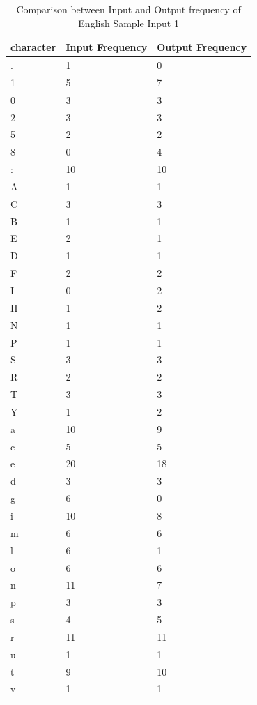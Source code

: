 \begin{table}[H]
\centering
\begin{tabular}{|p{2cm}|p{2cm}|p{2cm}|}
\hline
character & Input Frequency & Output Frequency \\
\hline
. & 1 & 0\\
\hline
1 & 5 & 7\\
\hline
0 & 3 & 3\\
\hline
2 & 3 & 3\\
\hline
5 & 2 & 2\\
\hline
8 & 0 & 4\\
\hline
: & 10 & 10\\
\hline
A & 1 & 1\\
\hline
C & 3 & 3\\
\hline
B & 1 & 1\\
\hline
E & 2 & 1\\
\hline
D & 1 & 1\\
\hline
F & 2 & 2\\
\hline
I & 0 & 2\\
\hline
H & 1 & 2\\
\hline
N & 1 & 1\\
\hline
P & 1 & 1\\
\hline
S & 3 & 3\\
\hline
R & 2 & 2\\
\hline
T & 3 & 3\\
\hline
Y & 1 & 2\\
\hline
a & 10 & 9\\
\hline
c & 5 & 5\\
\hline
e & 20 & 18\\
\hline
d & 3 & 3\\
\hline
g & 6 & 0\\
\hline
i & 10 & 8\\
\hline
m & 6 & 6\\
\hline
l & 6 & 1\\
\hline
o & 6 & 6\\
\hline
n & 11 & 7\\
\hline
p & 3 & 3\\
\hline
s & 4 & 5\\
\hline
r & 11 & 11\\
\hline
u & 1 & 1\\
\hline
t & 9 & 10\\
\hline
v & 1 & 1\\
\hline
\end{tabular}
\caption { Comparison between Input and Output frequency of English Sample Input 1}
\label {tab:Table1}
\end{table}

